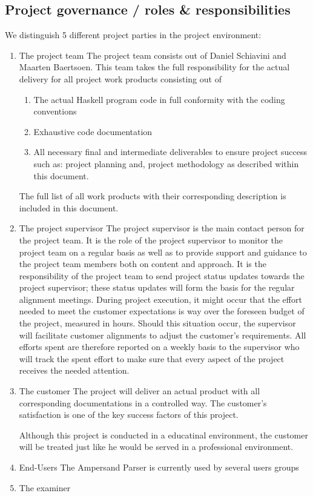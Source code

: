 \subsection{Project governance / roles \& responsibilities}
We distinguish 5 different project parties in the project environment:
\begin{enumerate}
	\item The project team
	The project team consists out of Daniel Schiavini and Maarten Baertsoen.
	This team takes the full responsibility for the actual delivery for all project work products consisting out of
	\begin{enumerate}
		\item The actual Haskell program code in full conformity with the coding conventions
		\item Exhaustive code documentation
		\item All necessary final and intermediate deliverables to ensure project success such as: project planning and, project methodology as described within this document. 
	\end {enumerate}
	The full list of all work products with their corresponding description is included in this document.
	\item The project supervisor
	The project supervisor is the main contact person for the project team. It is the role of the project supervisor to monitor the project team on a regular basis as well as to provide support and guidance to the project team members both on content and approach.
	It is the responsibility of the project team to send project status updates towards the project supervisor; these status updates will form the basis for the regular alignment meetings. 
	During project execution, it might occur that the effort needed to meet the customer expectations is way over the foreseen budget of the project, measured in hours. 
	Should this situation occur, the supervisor will facilitate customer alignments to adjust the customer’s requirements.
	All efforts spent are therefore reported on a weekly basis to the supervisor who will track the spent effort to make sure that every aspect of the project receives the needed attention.

	\item The customer
	The project will deliver an actual product with all corresponding documentations in a controlled way. 
	The customer's satisfaction is one of the key success factors of this project.

	Although this project is conducted in a educatinal environment, the customer will be treated just like he would be served in a professional environment. 
	\item End-Users
	The Ampersand Parser is currently used by several users groups 
	\item The examiner

\end {enumerate}


